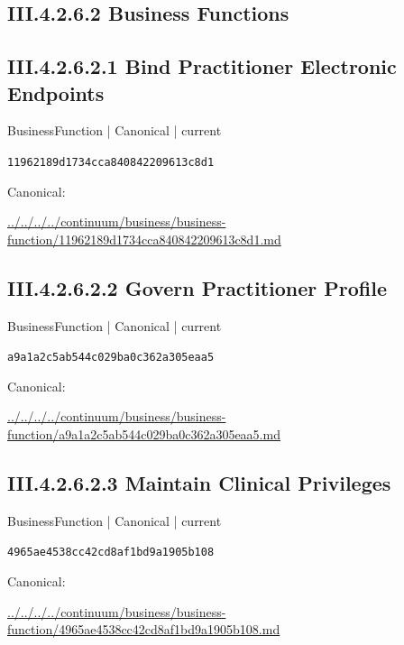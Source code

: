 \documentclass[10pt,a4paper]{article}
\begin{document}
\subsection*{III.4.2.6.2 Business Functions}
\subsection*{III.4.2.6.2.1 Bind Practitioner Electronic Endpoints}
\label{element-11962189d1734cca840842209613c8d1}
{\small BusinessFunction | Canonical | current}\par
\texttt{11962189d1734cca840842209613c8d1}\par
Canonical: \par
{\footnotesize\url{../../../../continuum/business/business-function/11962189d1734cca840842209613c8d1.md}}\par
\subsection*{III.4.2.6.2.2 Govern Practitioner Profile}
\label{element-a9a1a2c5ab544c029ba0c362a305eaa5}
{\small BusinessFunction | Canonical | current}\par
\texttt{a9a1a2c5ab544c029ba0c362a305eaa5}\par
Canonical: \par
{\footnotesize\url{../../../../continuum/business/business-function/a9a1a2c5ab544c029ba0c362a305eaa5.md}}\par
\subsection*{III.4.2.6.2.3 Maintain Clinical Privileges}
\label{element-4965ae4538cc42cd8af1bd9a1905b108}
{\small BusinessFunction | Canonical | current}\par
\texttt{4965ae4538cc42cd8af1bd9a1905b108}\par
Canonical: \par
{\footnotesize\url{../../../../continuum/business/business-function/4965ae4538cc42cd8af1bd9a1905b108.md}}\par
\end{document}
